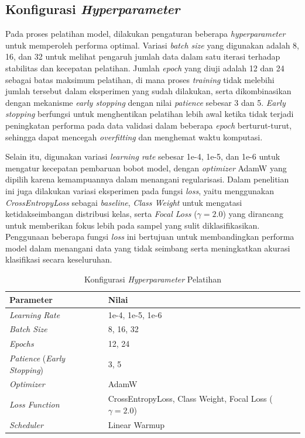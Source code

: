 \subsection{Konfigurasi \textit{Hyperparameter}} \label{IV.Model.Hyperparameter}

Pada proses pelatihan model, dilakukan pengaturan beberapa \textit{hyperparameter} untuk memperoleh performa optimal. Variasi \textit{batch size} yang digunakan adalah 8, 16, dan 32 untuk melihat pengaruh jumlah data dalam satu iterasi terhadap stabilitas dan kecepatan pelatihan. Jumlah \textit{epoch} yang diuji adalah 12 dan 24 sebagai batas maksimum pelatihan, di mana proses \textit{training} tidak melebihi jumlah tersebut dalam eksperimen yang sudah dilakukan, serta dikombinasikan dengan mekanisme \textit{early stopping} dengan nilai \textit{patience} sebesar 3 dan 5. \textit{Early stopping} berfungsi untuk menghentikan pelatihan lebih awal ketika tidak terjadi peningkatan performa pada data validasi dalam beberapa \textit{epoch} berturut-turut, sehingga dapat mencegah \textit{overfitting} dan menghemat waktu komputasi.

Selain itu, digunakan variasi \textit{learning rate} sebesar 1e-4, 1e-5, dan 1e-6 untuk mengatur kecepatan pembaruan bobot model, dengan \textit{optimizer} AdamW yang dipilih karena kemampuannya dalam menangani regularisasi. Dalam penelitian ini juga dilakukan variasi eksperimen pada fungsi \textit{loss}, yaitu menggunakan \textit{CrossEntropyLoss} sebagai \textit{baseline}, \textit{Class Weight} untuk mengatasi ketidakseimbangan distribusi kelas, serta \textit{Focal Loss} ($\gamma = 2.0$) yang dirancang untuk memberikan fokus lebih pada sampel yang sulit diklasifikasikan. Penggunaan beberapa fungsi \textit{loss} ini bertujuan untuk membandingkan performa model dalam menangani data yang tidak seimbang serta meningkatkan akurasi klasifikasi secara keseluruhan.

\begin{table}[H]
    \centering
    \caption{Konfigurasi \textit{Hyperparameter} Pelatihan}
    \label{table:4.hyperparams}
    \small
    \setlength{\tabcolsep}{3pt}
    \renewcommand{\arraystretch}{1.1}
    \begin{tabular}{p{4.0cm} p{3.5cm}}
        \hline
        \textbf{Parameter} & \textbf{Nilai} \\
        \hline
        \textit{Learning Rate} & 1e-4, 1e-5, 1e-6 \\
        \textit{Batch Size} & 8, 16, 32 \\
        \textit{Epochs} & 12, 24 \\
        \textit{Patience} (\textit{Early Stopping}) & 3, 5 \\
        \textit{Optimizer} & AdamW \\
        \textit{Loss Function} & CrossEntropyLoss, Class Weight, Focal Loss ($\gamma = 2.0$) \\
        \textit{Scheduler} & Linear Warmup \\
        \hline
    \end{tabular}
\end{table}


